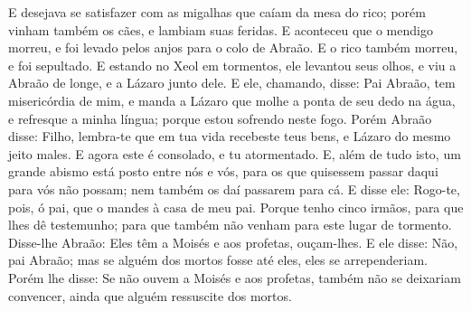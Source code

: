 {  E desejava se satisfazer com as migalhas que caíam da mesa do rico; porém vinham também os cães, e lambiam suas feridas.
  E aconteceu que o mendigo morreu, e foi levado pelos anjos para o colo de Abraão. E o rico também morreu, e foi sepultado.
  E estando no Xeol
 em tormentos, ele levantou seus olhos, e viu a Abraão de longe, e a Lázaro junto dele.
  E ele, chamando, disse: Pai Abraão, tem misericórdia de mim, e manda a Lázaro que molhe a ponta de seu dedo na água, e refresque a minha língua; porque estou sofrendo neste fogo.
  Porém Abraão disse: Filho, lembra-te que em tua vida recebeste teus bens, e Lázaro do mesmo jeito
{} males. E agora este é consolado, e tu
{} atormentado.
  E, além de tudo isto, um grande abismo está posto entre nós e vós, para os que quisessem passar daqui para vós não possam; nem também os daí passarem para cá.
  E disse ele: Rogo-te, pois, ó pai, que o mandes à casa de meu pai.
  Porque tenho cinco irmãos, para que lhes dê testemunho; para que também não venham para este lugar de tormento.
  Disse-lhe Abraão: Eles têm a Moisés e aos profetas, ouçam-lhes.
  E ele disse: Não, pai Abraão; mas se alguém dos mortos fosse até eles, eles se arrependeriam.
  Porém
{} lhe disse: Se não ouvem a Moisés e aos profetas, também não se deixariam convencer, ainda que alguém ressuscite dos mortos.
\par }

